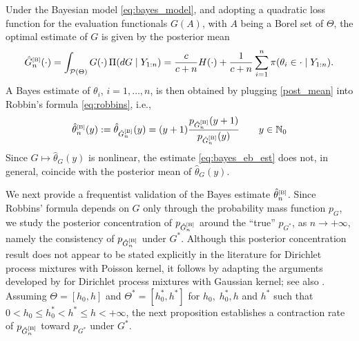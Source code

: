 \documentclass[twoside,12pt]{article}
\begin{document}
Under the Bayesian model \eqref{eq:bayes_model}, and adopting a quadratic loss function for the evaluation functionals $G(A)$, with $A$ being a Borel set of $\Theta$, the optimal estimate of $G$ is given by the posterior mean
\begin{equation}\label{post_mean}
\hat G_n^{\text{\tiny{[B]}}}(\cdot)=\int_{\mathcal P(\Theta)}G(\cdot)\,\Pi(dG\mid Y_{1:n})=\frac{c}{c+n}H(\cdot)+\frac{1}{c+n}\sum_{i=1}^n\pi(\theta_i\in \cdot\mid Y_{1:n}).
\end{equation}
A Bayes estimate of $\theta_{i}$, $i=1,\ldots,n$, is then obtained by plugging \eqref{post_mean} into Robbin's formula \eqref{eq:robbins}, i.e., 
\begin{equation}\label{eq:bayes_eb_est}
\hat{\theta}^{\text{\tiny{[B]}}}_{n}(y):=\hat{\theta}_{\hat G_n^{\text{\tiny{[B]}}}}(y)=(y+1)\frac{p_{\hat G_n^{\text{\tiny{[B]}}}}(y+1)}{p_{\hat G_n^{\text{\tiny{[B]}}}}(y)}\qquad y\in\mathbb{N}_{0}
\end{equation}
Since $G\mapsto \hat{\theta}_G(y)$ is nonlinear, the estimate \eqref{eq:bayes_eb_est} does not, in general, coincide with the posterior mean of $\hat\theta_G(y)$.

We next provide a frequentist validation of the Bayes estimate $\hat{\theta}^{\text{\tiny{[B]}}}_{n}$. Since Robbins' formula depends on $G$ only through the probability mass function $p_G$, we study the posterior concentration of $p_{\hat G_n^{\text{\tiny{[B]}}}}$ around the ``true'' $p_{G^{\ast}}$, as $n\rightarrow+\infty$, namely the consistency of $p_{\hat G_n^{\text{\tiny{[B]}}}}$ under $G^{\ast}$. Although this posterior concentration result does not appear to be stated explicitly in the literature for Dirichlet process mixtures with Poisson kernel, it follows by adapting the arguments developed by \citet[Theorem~5.1]{Gho(01)} for Dirichlet process mixtures with Gaussian kernel; see also \citet{Ign(26)}. Assuming $\Theta=[{h_0},h]$ and $\Theta^{\ast}=[{h_0^\ast},h^{\ast}]$ for ${h_0,\;h_0^\ast,h}$ and $h^{\ast}$ such that  $0<h_0\leq h_0^*<h^\ast\leq h<+\infty$, the next proposition establishes a contraction rate of $p_{\hat G_n^{\text{\tiny{[B]}}}}$ toward $p_{G^\ast}$ under $G^{\ast}$.
\end{document}
